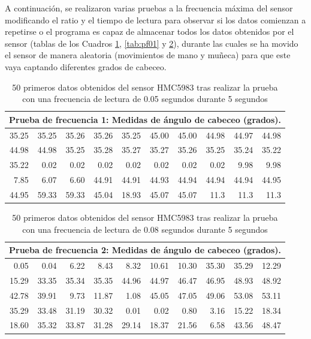 A continuación, se realizaron varias pruebas a la frecuencia máxima del sensor modificando el ratio y el tiempo de lectura para observar si los datos comienzan a repetirse o el programa es capaz de almacenar todos los datos obtenidos por el sensor (tablas de los Cuadros \ref{tab:pf005}, \ref{tab:pf01} y \ref{tab:pf008}), durante las cuales se ha movido el sensor de manera aleatoria (movimientos de mano y muñeca) para que este vaya captando diferentes grados de cabeceo.


\begin{table}[htbp]
  \centering
  {\sffamily\small
  \begin{tabular}{|*{10}{r|}}
        \hline
    \multicolumn{10}{c}{\textbf{Prueba de frecuencia 1}: Medidas de ángulo de cabeceo (grados).}\\
    \hline
    35.25 & 35.25 & 35.26 & 35.26 & 35.25 & 45.00 & 45.00 & 44.98 & 44.97 & 44.98\\
    \hline
    44.98 & 44.98 & 35.25 & 35.28 & 35.27 & 35.27 & 35.26 & 35.25 & 35.24 & 35.22 \\
    \hline
    35.22 & 0.02 & 0.02 & 0.02 & 0.02 & 0.02 & 0.02 & 0.02 & 9.98 & 9.98\\
    \hline
    7.85 & 6.07 & 6.60 & 44.91 & 44.91 & 44.93 & 44.94 & 44.94 & 44.94 & 44.95 \\
    \hline
    44.95 & 59.33 & 59.33 & 45.04 & 18.93 & 45.07 & 45.07 & 11.3 & 11.3 & 11.3 \\
    \hline
  \end{tabular}
  } %
  \caption[Prueba de frecuencia 1] {50 primeros datos obtenidos del sensor HMC5983 tras realizar la prueba con una frecuencia de lectura de 0.05 segundos durante 5 segundos}\label{tab:pf005}
\end{table}

\begin{table}[htbp]
  \centering
  {\sffamily\small
  \begin{tabular}{|*{10}{r|}}
        \hline
    \multicolumn{10}{c}{\textbf{Prueba de frecuencia 2}: Medidas de ángulo de cabeceo (grados).}\\
    \hline
    0.05 & 0.04 & 6.22 & 8.43 & 8.32 & 10.61 & 10.30 &  35.30 & 35.29 & 12.29\\
    \hline
    15.29 & 33.35 & 35.34 & 35.35 & 44.96 & 44.97 & 46.47 & 46.95 & 48.93 & 48.92 \\
    \hline
    42.78 & 39.91 & 9.73 & 11.87 & 1.08 & 45.05 & 47.05 & 49.06 & 53.08 & 53.11 \\
    \hline
    35.29 & 33.48 & 31.19 & 30.32 & 0.01 & 0.02 & 0.80 & 3.16 & 15.22 & 18.34\\
    \hline
    18.60 & 35.32 & 33.87 & 31.28 & 29.14 & 18.37 & 21.56 & 6.58 & 43.56 & 48.47\\
    \hline
  \end{tabular}
  } %
  \caption[Prueba de frecuencia 2]{50 primeros datos obtenidos del sensor HMC5983 tras realizar la prueba con una frecuencia de lectura de 0.08 segundos durante 5 segundos}\label{tab:pf008}
\end{table}

